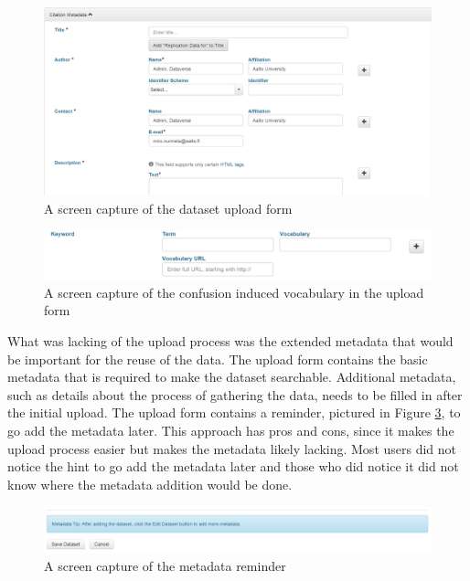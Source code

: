 \begin{figure}
    \begin{centering}
        \includegraphics[width=\textwidth]{images/upload}
    \end{centering}
    \caption{A screen capture of the dataset upload form}
    \label{fig:upload}
\end{figure}

\begin{figure}
    \begin{centering}
        \includegraphics[width=\textwidth]{images/vocabulary}
    \end{centering}
    \caption{A screen capture of the confusion induced vocabulary in the upload form}
    \label{fig:vocabulary}
\end{figure}

What was lacking of the upload process was the extended metadata that would be
important for the reuse of the data. The upload form contains the basic
metadata that is required to make the dataset searchable. Additional metadata,
such as details about the process of gathering the data, needs to be filled in
after the initial upload. The upload form contains a reminder, pictured in
Figure \ref{fig:hint}, to go add the metadata later. This approach has pros and
cons, since it makes the upload process easier but makes the metadata likely
lacking. Most users did not notice the hint to go add the metadata later and
those who did notice it did not know where the metadata addition would be done.

\begin{figure}
    \begin{centering}
        \includegraphics[width=\textwidth]{images/hint}
    \end{centering}
    \caption{A screen capture of the metadata reminder}
    \label{fig:hint}
\end{figure}

